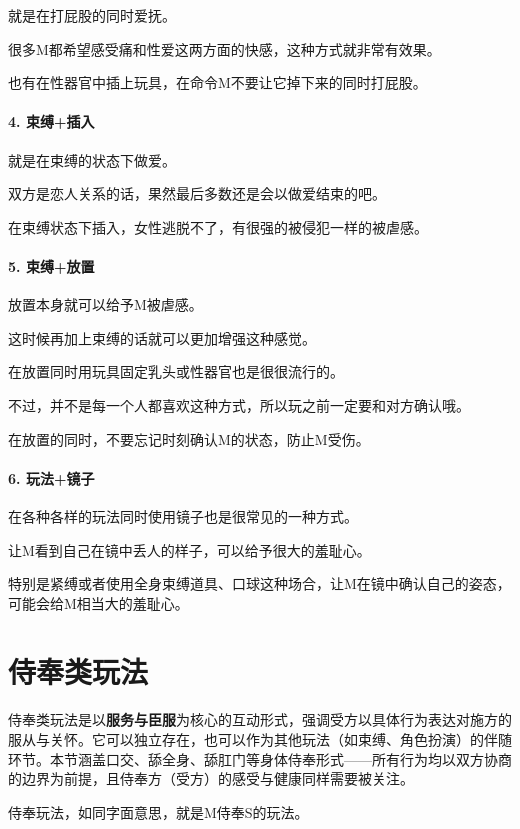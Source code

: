\documentclass[12pt,UTF8]{ctexbook}
\begin{document}
就是在打屁股的同时爱抚。

很多M都希望感受痛和性爱这两方面的快感，这种方式就非常有效果。

也有在性器官中插上玩具，在命令M不要让它掉下来的同时打屁股。

\paragraph{4. 束缚+插入}

就是在束缚的状态下做爱。

双方是恋人关系的话，果然最后多数还是会以做爱结束的吧。

在束缚状态下插入，女性逃脱不了，有很强的被侵犯一样的被虐感。

\paragraph{5. 束缚+放置}

放置本身就可以给予M被虐感。

这时候再加上束缚的话就可以更加增强这种感觉。

在放置同时用玩具固定乳头或性器官也是很很流行的。

不过，并不是每一个人都喜欢这种方式，所以玩之前一定要和对方确认哦。

在放置的同时，不要忘记时刻确认M的状态，防止M受伤。

\paragraph{6. 玩法+镜子}

在各种各样的玩法同时使用镜子也是很常见的一种方式。

让M看到自己在镜中丢人的样子，可以给予很大的羞耻心。

特别是紧缚或者使用全身束缚道具、口球这种场合，让M在镜中确认自己的姿态，可能会给M相当大的羞耻心。

\section{侍奉类玩法}

侍奉类玩法是以\textbf{服务与臣服}为核心的互动形式，强调受方以具体行为表达对施方的服从与关怀。它可以独立存在，也可以作为其他玩法（如束缚、角色扮演）的伴随环节。本节涵盖口交、舔全身、舔肛门等身体侍奉形式——所有行为均以双方协商的边界为前提，且侍奉方（受方）的感受与健康同样需要被关注。

侍奉玩法，如同字面意思，就是M侍奉S的玩法。
\end{document}
